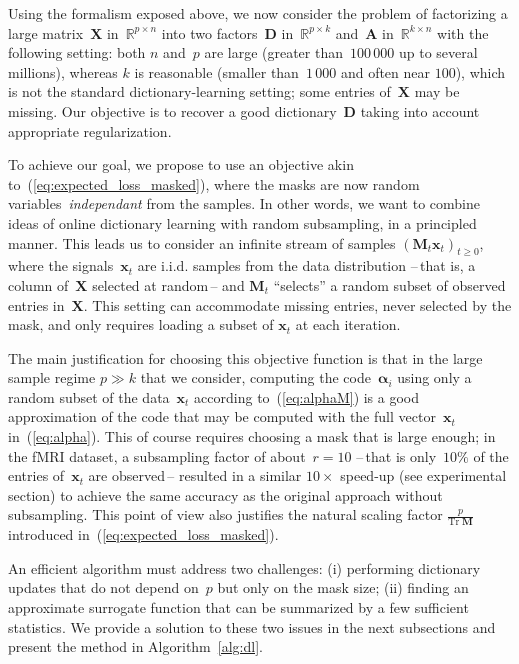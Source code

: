 \documentclass{article}
\def\Real{{\mathbb{R}}}
\def\x{{\mathbf x}}
\def\X{{\mathbf X}}
\def\A{{\mathbf A}}
\def\D{{\mathbf D}}
\def\x{{\mathbf x}}
\def\Real{{\mathbb R}}
\def\M{{\mathbf M}}
\def\trace{{\mathrm{Tr}\;}}
\newcommand{\balpha}{\boldsymbol{\alpha}}
\begin{document}
Using the formalism exposed above, we now consider the problem of factorizing a
large matrix~$\X$ in~$\Real^{p \times n}$ into two factors~$\D$ in~$\Real^{p
\times k}$ and~$\A$ in~$\Real^{k \times n}$ with the following setting:
both $n$ and~$p$ are large (greater than~$100\,000$ up to several millions),
whereas $k$ is reasonable (smaller than~$1\,000$ and often near $100$),
which is not the standard dictionary-learning setting; some
entries of~$\X$ may be missing.  Our objective is to recover a good
dictionary~$\D$ taking into account appropriate regularization.

To achieve our goal, we propose to use an objective akin
to~(\ref{eq:expected_loss_masked}), where the masks are now random variables~\textit{independant} from the samples.
In other words, we want to combine ideas of online dictionary learning with
random subsampling, in a principled manner. This leads us to consider an
infinite stream of samples $(\M_t \x_t)_{t \geq 0}$, where the signals~$\x_t$ are i.i.d.
samples from the data distribution --\,that is, a column of~$\X$ selected at
random\,-- and $\M_t$ ``selects'' a random subset of observed entries in~$\X$.
This setting can accommodate missing entries, never selected by the
mask, and only requires loading a subset of $\x_t$ at each iteration.

The main justification for choosing this objective function is that
in the large sample regime $p \gg k$ that we consider,
computing the code~$\balpha_i$ using only a random subset of the data~$\x_t$
according to~(\ref{eq:alphaM}) is a good approximation of the code that may be
computed with the full vector~$\x_t$ in~(\ref{eq:alpha}). This of course
requires choosing a mask that is large enough; in the fMRI dataset, a
subsampling factor of about~$r=10$ --\,that is only~$10\%$ of the entries
of~$\x_t$ are observed\,-- resulted in a similar $10\times$ speed-up (see
experimental section) to achieve the same accuracy as the original approach without subsampling.  This point of view also justifies the
natural scaling factor $\frac{p}{\trace \M}$
introduced in~(\ref{eq:expected_loss_masked}).

An efficient algorithm must address two challenges: (i) performing
dictionary updates that do not depend on~$p$ but only on the mask size;
(ii) finding an approximate surrogate function that can be summarized by a few
sufficient statistics.
We provide a solution to these two issues in the next subsections and present
the method in Algorithm~\ref{alg:dl}.
\end{document}

